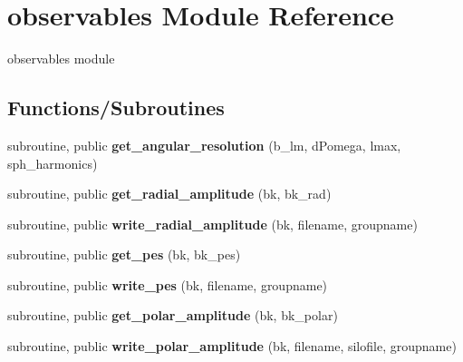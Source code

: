 \hypertarget{namespaceobservables}{}\section{observables Module Reference}
\label{namespaceobservables}


observables module  


\subsection*{Functions/\+Subroutines}
\begin{DoxyCompactItemize}
\item 
\mbox{\label{namespaceobservables_a8a6bcfb58d52d4fe82720b4f70a9a055}} 
subroutine, public {\bfseries get\+\_\+angular\+\_\+resolution} (b\+\_\+lm, d\+Pomega, lmax, sph\+\_\+harmonics)
\item 
\mbox{\label{namespaceobservables_a5d282836884dfc0914f77cd5fdf8bc70}} 
subroutine, public {\bfseries get\+\_\+radial\+\_\+amplitude} (bk, bk\+\_\+rad)
\item 
\mbox{\label{namespaceobservables_a415e076591f8d19abeeb7c1461c059c0}} 
subroutine, public {\bfseries write\+\_\+radial\+\_\+amplitude} (bk, filename, groupname)
\item 
\mbox{\label{namespaceobservables_a0b1a7af46f2ea07e735c4cb3a6abd1af}} 
subroutine, public {\bfseries get\+\_\+pes} (bk, bk\+\_\+pes)
\item 
\mbox{\label{namespaceobservables_a49cbb4d39bc897eba652c7bd0c7b6649}} 
subroutine, public {\bfseries write\+\_\+pes} (bk, filename, groupname)
\item 
\mbox{\label{namespaceobservables_a9c5b6413cb5024bc9ec9ea111f3bba83}} 
subroutine, public {\bfseries get\+\_\+polar\+\_\+amplitude} (bk, bk\+\_\+polar)
\item 
\mbox{\label{namespaceobservables_a7fe1bde01013c09aef479372c0943bb5}} 
subroutine, public {\bfseries write\+\_\+polar\+\_\+amplitude} (bk, filename, silofile, groupname)
\item 

\end{DoxyCompactItemize}
